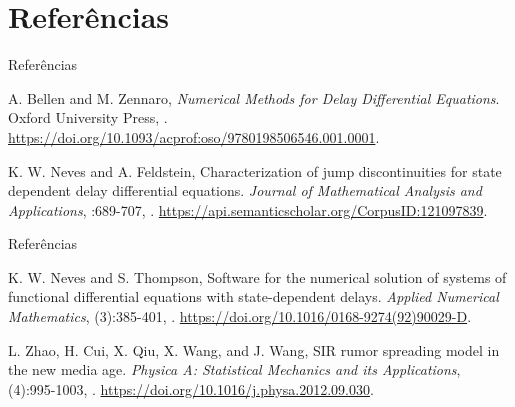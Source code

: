 \documentclass{beamer}
\theoremstyle{plain}
\theoremstyle{definition}
\begin{document}
\section{Referências}
\begin{frame}{Referências}


\begin{thebibliography}{2}


\beamertemplatebookbibitems
{}
A. Bellen and M. Zennaro,
\newblock \emph{Numerical Methods for Delay Differential Equations}.
\newblock Oxford University Press,
.
\newblock \url{https://doi.org/10.1093/acprof:oso/9780198506546.001.0001}.

\beamertemplatearticlebibitems
{}
K. W. Neves and A. Feldstein,
\newblock Characterization of jump discontinuities for state dependent delay differential equations.
\newblock \emph{Journal of Mathematical Analysis and Applications},
:689-707,
.
\newblock \url{https://api.semanticscholar.org/CorpusID:121097839}.



 
\end{thebibliography}
\end{frame}



\begin{frame}{Referências}


\begin{thebibliography}{2}



\beamertemplatearticlebibitems
{}
K. W. Neves and S. Thompson,
\newblock Software for the numerical solution of systems of functional differential equations with state-dependent delays.
\newblock \emph{Applied Numerical Mathematics},
(3):385-401,
.
\newblock \url{https://doi.org/10.1016/0168-9274(92)90029-D}.
 

\beamertemplatearticlebibitems
{}
L. Zhao, H. Cui, X. Qiu, X. Wang, and J. Wang,
\newblock SIR rumor spreading model in the new media age.
\newblock \emph{Physica A: Statistical Mechanics and its Applications},
(4):995-1003,
.
\newblock \url{https://doi.org/10.1016/j.physa.2012.09.030}.


 
\end{thebibliography}
\end{frame}
\end{document}
